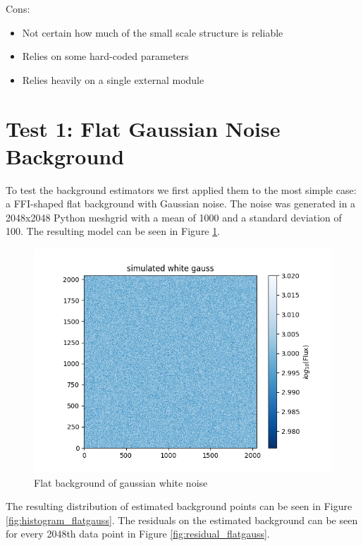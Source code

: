 \documentclass[10pt, a4paper]{article}
\begin{document}
Cons:
\begin{itemize}
\item Not certain how much of the small scale structure is reliable
\item Relies on some hard-coded parameters
\item Relies heavily on a single external module
\end{itemize}

\section{Test 1:  Flat Gaussian Noise Background}
To test the background estimators we first applied them to the most simple case: a FFI-shaped flat background with Gaussian noise. The noise was generated in a 2048x2048 Python meshgrid with a mean of 1000 and a standard deviation of 100. The resulting model can be seen in Figure \ref{fig:flatgauss}.\\

\begin{figure}[h!]
\includegraphics[width=\textwidth]{flatgauss}
\caption{Flat background of gaussian white noise}
\label{fig:flatgauss}
\end{figure}

The resulting distribution of estimated background points can be seen in Figure \ref{fig:histogram_flatgauss}. The residuals on the estimated background can be seen for every 2048th data point in Figure \ref{fig:residual_flatgauss}.
\end{document}
